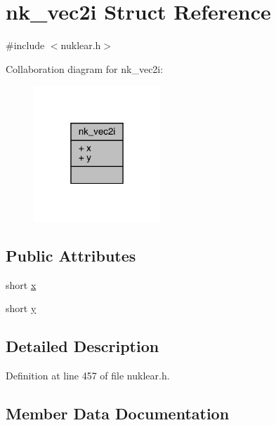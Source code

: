 \hypertarget{structnk__vec2i}{}\section{nk\+\_\+vec2i Struct Reference}
\label{structnk__vec2i}


{\ttfamily \#include $<$nuklear.\+h$>$}



Collaboration diagram for nk\+\_\+vec2i\+:
\nopagebreak
\begin{figure}[H]
\begin{center}
\leavevmode
\includegraphics[width=135pt]{structnk__vec2i__coll__graph}
\end{center}
\end{figure}
\subsection*{Public Attributes}
\begin{DoxyCompactItemize}
\item 
short \mbox{\hyperlink{structnk__vec2i_ad2ac1c7d932f8f02cb3becaf866b0892}{x}}
\item 
short \mbox{\hyperlink{structnk__vec2i_a08585382e94fa8985f9084f68282f349}{y}}
\end{DoxyCompactItemize}


\subsection{Detailed Description}


Definition at line 457 of file nuklear.\+h.



\subsection{Member Data Documentation}
\mbox{\label{structnk__vec2i_ad2ac1c7d932f8f02cb3becaf866b0892}} 
